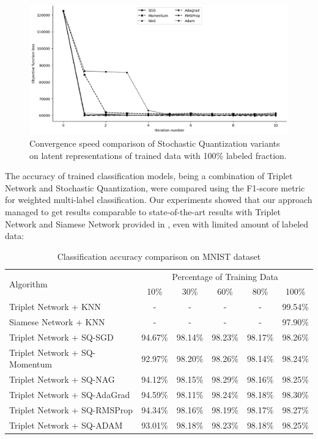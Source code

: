 \begin{figure}
    \centering
    \includegraphics[width=\textwidth]{figures/sq_convergence_full_dataset.png}
    \caption{Convergence speed comparison of Stochastic Quantization variants on latent representations of trained data with 100\% labeled fraction.} \label{convergence:fig}
\end{figure}

The accuracy of trained classification models, being a combination of Triplet Network and Stochastic Quantization, were compared using the F1-score metric \cite{Chinchor_1992} for weighted multi-label classification. Our experiments showed that our approach managed to get results comparable to state-of-the-art results with Triplet Network and Siamese Network provided in \cite{Hoffer_2015}, even with limited amount of labeled data:

\begin{table} 
\caption{Classification accuracy comparison on MNIST dataset \cite{lecun2010mnist}}
\label{accuracy:table}
    \begin{tabularx}{\textwidth}{|X|*{5}{c|}}
        \hline
        \multirow{2}{*}{Algorithm} & \multicolumn{5}{c|}{Percentage of Training Data} \\
        \cline{2-6}
        & 10\% & 30\% & 60\% & 80\% & 100\% \\
        \hline
        Triplet Network + KNN         & - & - & - & - & 99.54\% \\
        Siamese Network + KNN         & - & - & - & - & 97.90\% \\
        Triplet Network + SQ-SGD      & 94.67\% & 98.14\% & 98.23\% & 98.17\% & 98.26\% \\
        Triplet Network + SQ-Momentum & 92.97\% & 98.20\% & 98.26\% & 98.14\% & 98.24\% \\
        Triplet Network + SQ-NAG      & 94.12\% & 98.15\% & 98.29\% & 98.16\% & 98.25\% \\
        Triplet Network + SQ-AdaGrad  & 94.59\% & 98.11\% & 98.24\% & 98.18\% & 98.30\% \\
        Triplet Network + SQ-RMSProp  & 94.34\% & 98.16\% & 98.19\% & 98.17\% & 98.27\% \\
        Triplet Network + SQ-ADAM     & 93.01\% & 98.18\% & 98.23\% & 98.18\% & 98.25\% \\
        \hline
    \end{tabularx}
\end{table}
